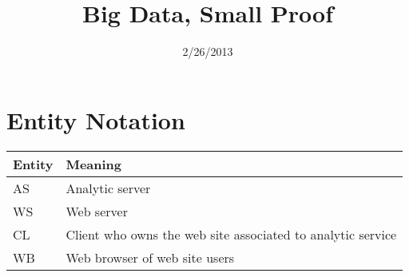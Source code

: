 \documentclass[12pt]{article}
\begin{document}
\title{Big Data, Small Proof}
\date{2/26/2013}
\maketitle

\section{Entity Notation}

\begin{center}
\begin{tabular}{ | l | l | }
\hline 
Entity	& Meaning	\\
\hline \hline    
AS	& Analytic server	\\
\hline
WS	& Web server	\\
\hline
CL 	& Client who owns the web site associated to analytic service	\\
\hline
WB	& Web browser of web site users	\\
\hline
\end{tabular}
\end{center}





%   
%  
\end{document}
